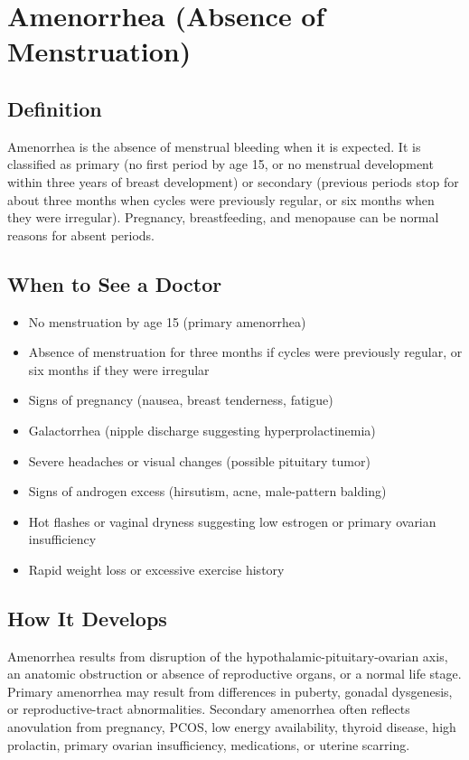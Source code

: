 \chapter{Amenorrhea (Absence of Menstruation)}

\section*{Definition}
Amenorrhea is the absence of menstrual bleeding when it is expected. It is classified as primary (no first period by age 15, or no menstrual development within three years of breast development) or secondary (previous periods stop for about three months when cycles were previously regular, or six months when they were irregular). Pregnancy, breastfeeding, and menopause can be normal reasons for absent periods.

\section*{When to See a Doctor}
\begin{itemize}
\item No menstruation by age 15 (primary amenorrhea)
\item Absence of menstruation for three months if cycles were previously regular, or six months if they were irregular
\item Signs of pregnancy (nausea, breast tenderness, fatigue)
\item Galactorrhea (nipple discharge suggesting hyperprolactinemia)
\item Severe headaches or visual changes (possible pituitary tumor)
\item Signs of androgen excess (hirsutism, acne, male-pattern balding)
\item Hot flashes or vaginal dryness suggesting low estrogen or primary ovarian insufficiency
\item Rapid weight loss or excessive exercise history
\end{itemize}

\section*{How It Develops}
Amenorrhea results from disruption of the hypothalamic-pituitary-ovarian axis, an anatomic obstruction or absence of reproductive organs, or a normal life stage. Primary amenorrhea may result from differences in puberty, gonadal dysgenesis, or reproductive-tract abnormalities. Secondary amenorrhea often reflects anovulation from pregnancy, PCOS, low energy availability, thyroid disease, high prolactin, primary ovarian insufficiency, medications, or uterine scarring.

